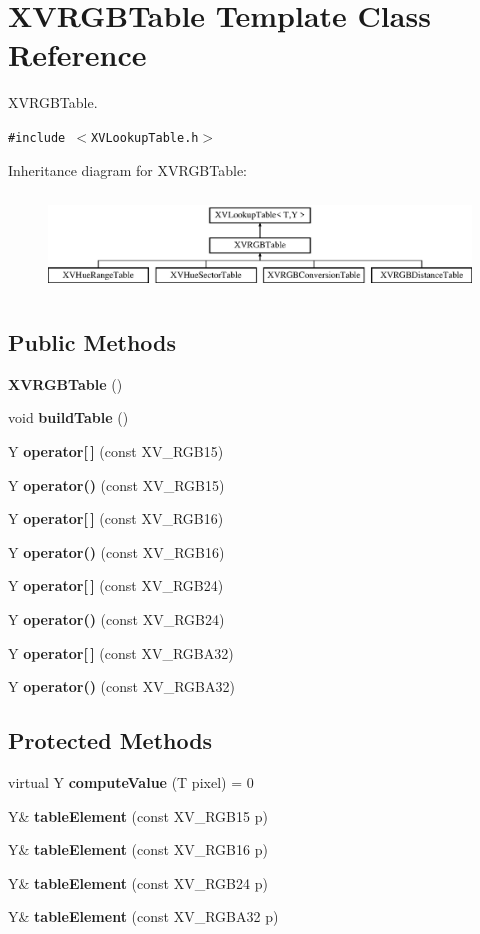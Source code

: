 \hypertarget{class_XVRGBTable}{
\section{XVRGBTable  Template Class Reference}
\label{XVRGBTable}
}
XVRGBTable. 


{\tt \#include $<$XVLookup\-Table.h$>$}

Inheritance diagram for XVRGBTable:\begin{figure}[H]
\begin{center}
\leavevmode
\includegraphics[height=2.64151cm]{class_XVRGBTable}
\end{center}
\end{figure}
\subsection*{Public Methods}
\begin{CompactItemize}
\item 
{\bf XVRGBTable} ()
\item 
void {\bf build\-Table} ()
\item 
Y {\bf operator\mbox{[}$\,$\mbox{]}} (const XV\_\-RGB15)
\item 
Y {\bf operator()} (const XV\_\-RGB15)
\item 
Y {\bf operator\mbox{[}$\,$\mbox{]}} (const XV\_\-RGB16)
\item 
Y {\bf operator()} (const XV\_\-RGB16)
\item 
Y {\bf operator\mbox{[}$\,$\mbox{]}} (const XV\_\-RGB24)
\item 
Y {\bf operator()} (const XV\_\-RGB24)
\item 
Y {\bf operator\mbox{[}$\,$\mbox{]}} (const XV\_\-RGBA32)
\item 
Y {\bf operator()} (const XV\_\-RGBA32)
\end{CompactItemize}
\subsection*{Protected Methods}
\begin{CompactItemize}
\item 
\label{XVRGBTable_b0}
\hypertarget{class_XVRGBTable_b0}{
virtual Y {\bf compute\-Value} (T pixel) = 0}

\item 
Y\& {\bf table\-Element} (const XV\_\-RGB15 p)
\item 
Y\& {\bf table\-Element} (const XV\_\-RGB16 p)
\item 
Y\& {\bf table\-Element} (const XV\_\-RGB24 p)
\item 
Y\& {\bf table\-Element} (const XV\_\-RGBA32 p)
\end{CompactItemize}



